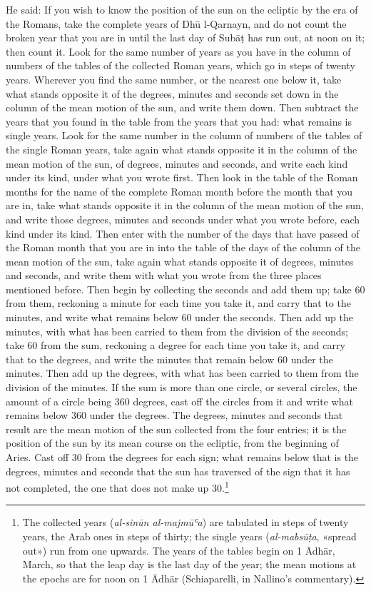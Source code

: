 \documentclass[11pt]{article}
\newcommand{\ArPage}[1]{\marginpar{\footnotesize\color{gray}Ar.\,p.\,#1}}
\begin{document}
\par \ArPage{107}He said: If you wish to know the position of the sun on the ecliptic by the era of the Romans, take the complete years of Dhū l-Qarnayn, and do not count the broken year that you are in until the last day of Subāṭ has run out, at noon on it; then count it. Look for the same number of years as you have in the column of numbers of the tables of the collected Roman years, which go in steps of twenty years. Wherever you find the same number, or the nearest one below it, take what stands opposite it of the degrees, minutes and seconds set down in the column of the mean motion of the sun, and write them down. Then subtract the years that you found in the table from the years that you had: what remains is single years. Look for the same number in the column of numbers of the tables of the single Roman years, take again what stands opposite it in the column of the mean motion of the sun, of degrees, minutes and seconds, and write each kind under its kind, under what you wrote first. Then look in the table of the Roman months for the name of the complete Roman month before the month that you are in, take what stands opposite it in the column of the mean motion of the sun, and write those degrees, minutes and seconds under what you wrote before, each kind under its kind. Then enter with the number of the days that have passed of the Roman month that you are in into the table of the days of the column of the mean motion of the sun, take again what stands opposite it of degrees, minutes and seconds, and write them with what you wrote from the three places mentioned before. Then begin by collecting the seconds and add them up; take 60 from them, reckoning a minute for each time you take it, and carry that to the minutes, and write what remains below 60 under the seconds. Then add up the minutes, with what has been carried to them from the division of the seconds; take 60 from the sum, reckoning a degree for each time you take it, and carry that to the degrees, and write the minutes that remain below 60 under the minutes. Then add up the degrees, with what has been carried to them from the division of the minutes. If the sum is more than one circle, or several circles, the amount of a circle being 360 degrees, cast off the circles from it and write what remains below 360 under the degrees. The degrees, minutes and seconds that result are the mean motion of the sun collected from the four entries; it is the position of the sun by its mean course on the ecliptic, from the beginning of Aries. Cast off 30 from the degrees for each sign; what remains below that is the degrees, minutes and seconds that the sun has traversed of the sign that it has not completed, the one that does not make up 30.\footnote{The collected years (\emph{al-sinūn al-majmūʿa}) are tabulated in steps of twenty years, the Arab ones in steps of thirty; the single years (\emph{al-mabsūṭa}, «spread out») run from one upwards. The years of the tables begin on 1 Ādhār, March, so that the leap day is the last day of the year; the mean motions at the epochs are for noon on 1 Ādhār (Schiaparelli, in Nallino's commentary).}\par
\end{document}
